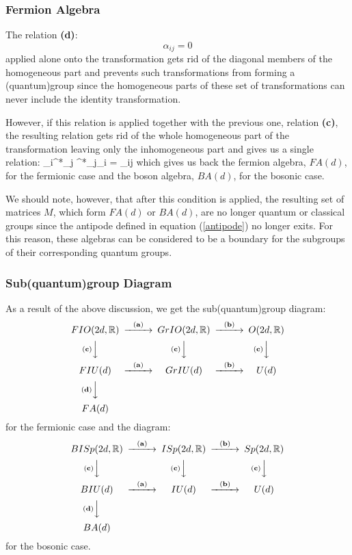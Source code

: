 \subsubsection{Fermion Algebra}
The relation {\bf(d)}:
\[
\alpha_{ij} = 0
\]
applied alone onto the transformation gets rid of the diagonal
members of the homogeneous part and prevents such transformations
from forming a (quantum)group since the homogeneous parts of these
set of transformations can never include the identity
transformation.

However, if this relation is applied together with the previous
one, relation {\bf(c)}, the resulting relation gets rid of the
whole homogeneous part of the transformation leaving only the
inhomogeneous part and gives us a single relation: \beq
\gamma_i\gamma^*_j \mp \gamma^*_j\gamma_i = \delta_{ij} \eeq which
gives us back the fermion algebra, $FA(d)$, for the fermionic case
and the boson algebra, $BA(d)$, for the bosonic case.

We should note, however, that after this condition is applied, the
resulting set of matrices $M$, which form $FA(d)$ or $BA(d)$, are
no longer quantum or classical groups since the antipode defined
in equation (\ref{antipode}) no longer exits. For this reason,
these algebras can be considered to be a boundary for the
subgroups of their corresponding quantum groups.

\subsubsection{Sub(quantum)group Diagram}
As a result of the above discussion, we get the sub(quantum)group
diagram:
\[
\begin{CD}
{FIO(2d, \IR)} @>{\bf (a)}>> {GrIO(2d, \IR)} @>{\bf (b)}>> {O(2d, \IR)} \\
@V{\bf (c)}VV @V{\bf (c)}VV @V{\bf (c)}VV \\
{FIU(d)}  @>{\bf (a)}>> {GrIU(d)} @>{\bf (b)}>> {U(d)} \\
@V{\bf (d)}VV \\
{FA(d)}
\end{CD}
\]
for the fermionic case and the diagram:
\[
\begin{CD}
{BISp(2d, \IR)} @>{\bf (a)}>> {ISp(2d, \IR)} @>{\bf (b)}>> {Sp(2d, \IR)} \\
@V{\bf (c)}VV @V{\bf (c)}VV @V{\bf (c)}VV \\
{BIU(d)} @>{\bf (a)}>> {IU(d)} @>{\bf (b)}>> {U(d)} \\
@V{\bf (d)}VV \\
{BA(d)}
\end{CD}
\]
for the bosonic case.

